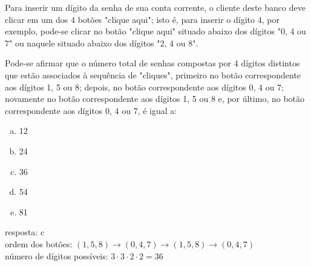 \begin{ex}
\begin{center}
\begin{tikzpicture}[x=0.75pt,y=0.75pt,yscale=-1,xscale=1]
\end{tikzpicture}
\end{center}




Para inserir um dígito da senha de sua conta corrente, o cliente deste banco deve clicar em um dos 4 botões "clique aqui"; isto é, para inserir o dígito 4, por exemplo, pode-se clicar no botão "clique aqui" situado abaixo dos dígitos "0, 4 ou 7" ou naquele situado abaixo dos dígitos "2, 4 ou 8".

Pode-se afirmar que o número total de senhas compostas por 4 dígitos distintos que estão associados à sequência de "cliques", primeiro no botão correspondente aos dígitos 1, 5 ou 8; depois, no botão correspondente aos dígitos 0, 4 ou 7; novamente no botão correspondente aos dígitos 1, 5 ou 8 e, por último, no botão correspondente aos dígitos 0, 4 ou 7, é igual a:
    \begin{enumerate}[(a)]
    \item 12
    \item 24
    \item 36
    \item 54
    \item 81
    \end{enumerate}
      \begin{sol}
        resposta: c  \\
        ordem dos botões: $(1,5,8)\rightarrow(0,4,7)\rightarrow(1,5,8)\rightarrow(0,4,7)$ \\
        número de dígitos possíveis: $3\cdot3\cdot2\cdot2=36$
      \end{sol}
\end{ex}